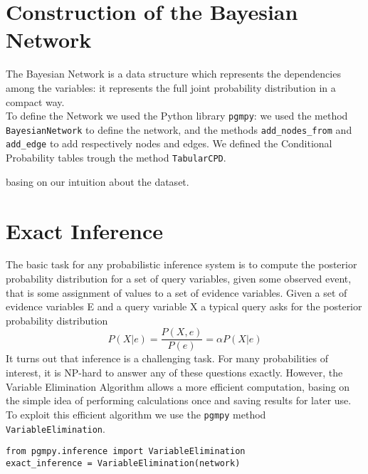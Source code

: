 \documentclass[letterpaper,11pt]{article}
\begin{document}
\section{Construction of the Bayesian Network}
The Bayesian Network is a data structure which represents the dependencies among the variables: it represents the full joint probability distribution in a compact way. \\ To define the Network we used the Python library \texttt{pgmpy}: we used the method \texttt{BayesianNetwork} to define the network, and the methods \texttt{add\_nodes\_from} and \texttt{add\_edge} to add respectively nodes and edges. We defined the Conditional Probability tables trough the method  \texttt{TabularCPD}.

basing on our intuition about the dataset.




\section{Exact Inference}

The basic task for any probabilistic inference system is to compute the posterior probability distribution for a set of query variables, given some observed event, that is some assignment of values to a set of evidence variables. Given a set of evidence variables E and a query variable X a typical query asks for the posterior probability distribution 
\begin{equation}
P(X| e) = \frac{P(X, e)}{P(e)} = \alpha P(X| e) 
\end{equation}
It turns out that inference is a challenging task. For many probabilities of interest, it is NP-hard to answer any of these questions exactly. However, the Variable Elimination Algorithm allows a more efficient computation, basing on the simple idea of performing calculations once and saving results for later use.\\ To exploit this efficient algorithm we use the \texttt{pgmpy} method \texttt{VariableElimination}. 

\begin{lstlisting}
from pgmpy.inference import VariableElimination
exact_inference = VariableElimination(network)
\end{lstlisting}
\end{document}
